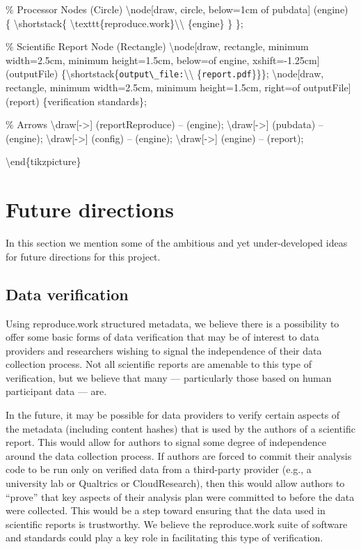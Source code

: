 \% Processor Nodes (Circle)
\textbackslash{}node[draw, circle, below=1cm of pubdata] (engine) \{
\textbackslash{}shortstack\{
\textbackslash{}texttt\{reproduce.work\}\textbackslash{}\textbackslash{}
\{engine\}
\}
\};

\% Scientific Report Node (Rectangle)
\textbackslash{}node[draw, rectangle, minimum width=2.5cm, minimum height=1.5cm, below=of engine, xshift=-1.25cm] (outputFile) \{\textbackslash{}shortstack\{\texttt{output\textbackslash{}\_file:}\textbackslash{}\textbackslash{} \{\texttt{report.pdf}\}\}\};
\textbackslash{}node[draw, rectangle, minimum width=2.5cm, minimum height=1.5cm, right=of outputFile] (report) \{verification standards\};

\% Arrows
\textbackslash{}draw[->] (reportReproduce) -- (engine);
\textbackslash{}draw[->] (pubdata) -- (engine);
\textbackslash{}draw[->] (config) -- (engine);
\textbackslash{}draw[->] (engine) -- (report);

\textbackslash{}end\{tikzpicture\}

\hypertarget{future-directions}{%
\section{Future directions}\label{future-directions}}

In this section we mention some of the ambitious and yet under-developed ideas for future directions for this project.

\hypertarget{data-verification}{%
\subsection{Data verification}\label{data-verification}}

Using reproduce.work structured metadata, we believe there is a possibility to offer some basic forms of data verification that may be of interest to data providers and researchers wishing to signal the independence of their data collection process. Not all scientific reports are amenable to this type of verification, but we believe that many --- particularly those based on human participant data --- are.

In the future, it may be possible for data providers to verify certain aspects of the metadata (including content hashes) that is used by the authors of a scientific report. This would allow for authors to signal some degree of independence around the data collection process. If authors are forced to commit their analysis code to be run only on verified data from a third-party provider (e.g., a university lab or Qualtrics or CloudResearch), then this would allow authors to ``prove'' that key aspects of their analysis plan were committed to before the data were collected. This would be a step toward ensuring that the data used in scientific reports is trustworthy.
We believe the reproduce.work suite of software and standards could play a key role in facilitating this type of verification.

